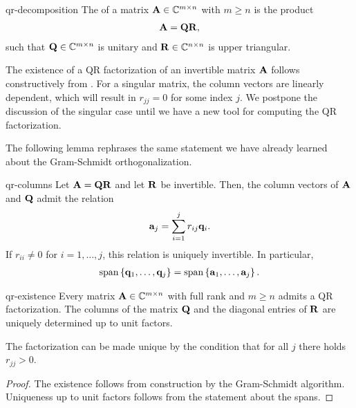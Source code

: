 \begin{Definition}{qr-decomposition}
  The  of a matrix $\mathbf A\in\mathbb C^{m\times n}$
  with $m\ge n$ is the product
  \begin{gather}
    \mathbf A = \mathbf Q\mathbf R,
  \end{gather}
  such that $\mathbf Q \in\mathbb C^{m\times n}$ is unitary and
  $\mathbf R\in \mathbb C^{n\times n}$ is upper triangular.
\end{Definition}

\begin{intro}
  The existence of a QR factorization of an invertible matrix $\mathbf A$
  follows constructively from . For a
  singular matrix, the column vectors are linearly dependent, which
  will result in $r_{jj}=0$ for some index $j$. We postpone the
  discussion of the singular case until we have a new tool for
  computing the QR factorization.

  The following lemma rephrases the same statement we have already
  learned about the Gram-Schmidt orthogonalization.
\end{intro}

\begin{Lemma}{qr-columns}
  Let $\mathbf A = \mathbf Q\mathbf R$ and let $\mathbf R$ be invertible. Then, the
  column vectors of $\mathbf A$ and $\mathbf Q$ admit the relation
  \begin{gather}
    \mathbf a_j = \sum_{i=1}^j r_{ij} \mathbf q_i.
  \end{gather}
  If $r_{ii}\neq 0$ for $i=1,\dots,j$, this relation is uniquely
  invertible. In particular,
  \begin{gather}
    \operatorname{span}\left\{\mathbf q_1,\dots,\mathbf q_j\right\}
    =
    \operatorname{span}\left\{\mathbf a_1,\dots,\mathbf a_j\right\}.
  \end{gather}
\end{Lemma}

\begin{Theorem}{qr-existence}
  Every matrix $\mathbf A\in\mathbb C^{m\times n}$ with full rank and $m\ge n$
  admits a QR factorization. The columns of the matrix
  $\mathbf Q$ and the diagonal entries of $\mathbf R$ are uniquely determined
  up to unit factors.

  The factorization can be made unique by the condition that for all
  $j$ there holds $r_{jj} > 0$.
\end{Theorem}

\begin{proof}
  The existence follows from construction by the Gram-Schmidt
  algorithm. Uniqueness up to unit factors follows from the statement
  about the spans.
\end{proof}

